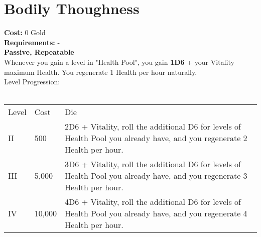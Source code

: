 \section{Bodily Thoughness}\label{sec:bodilythoughness}
\textbf{Cost:} 0 Gold\\
\textbf{Requirements:} -\\
\textbf{Passive, Repeatable}\\
Whenever you gain a level in "Health Pool", you gain \textbf{1D6} + your Vitality maximum Health.
You regenerate 1 Health per hour naturally.
\\
Level Progression:\\
\\
\begin{tabular}{l | l | p{12cm} }
    Level & Cost & Die\\
    II & 500 & 2D6 + Vitality, roll the additional D6 for levels of Health Pool you already have, and you regenerate 2 Health per hour. \\
    III & 5,000 & 3D6 + Vitality, roll the additional D6 for levels of Health Pool you already have, and you regenerate 3 Health per hour. \\
    IV & 10,000 & 4D6 + Vitality, roll the additional D6 for levels of Health Pool you already have, and you regenerate 4 Health per hour.\\
\end{tabular}